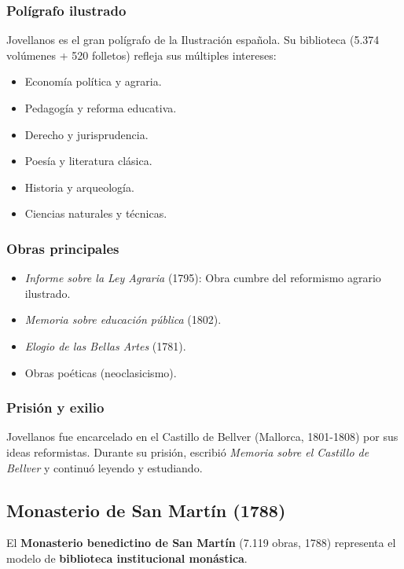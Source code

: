 \documentclass[11pt,a4paper]{article}
\begin{document}
\subsubsection{Polígrafo ilustrado}

Jovellanos es el gran polígrafo de la Ilustración española. Su biblioteca (5.374 volúmenes + 520 folletos) refleja sus múltiples intereses:

\begin{itemize}
\item Economía política y agraria.
\item Pedagogía y reforma educativa.
\item Derecho y jurisprudencia.
\item Poesía y literatura clásica.
\item Historia y arqueología.
\item Ciencias naturales y técnicas.
\end{itemize}

\subsubsection{Obras principales}

\begin{itemize}
\item \textit{Informe sobre la Ley Agraria} (1795): Obra cumbre del reformismo agrario ilustrado.
\item \textit{Memoria sobre educación pública} (1802).
\item \textit{Elogio de las Bellas Artes} (1781).
\item Obras poéticas (neoclasicismo).
\end{itemize}

\subsubsection{Prisión y exilio}

Jovellanos fue encarcelado en el Castillo de Bellver (Mallorca, 1801-1808) por sus ideas reformistas. Durante su prisión, escribió \textit{Memoria sobre el Castillo de Bellver} y continuó leyendo y estudiando.

\subsection{Monasterio de San Martín (1788)}

El \textbf{Monasterio benedictino de San Martín} (7.119 obras, 1788) representa el modelo de \textbf{biblioteca institucional monástica}.
\end{document}
